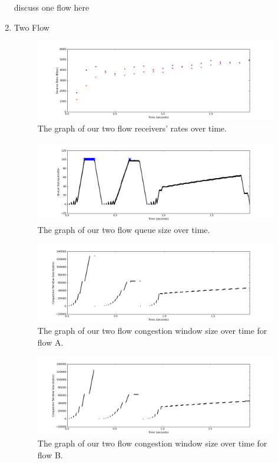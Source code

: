 \documentclass[11pt]{article}
\begin{document}
\begin{enumerate}
discuss one flow here

\bigskip
\item Two Flow

\begin{figure}[H]
\caption{The graph of our two flow receivers' rates over time.}
  \label{figure5}
    \centering
    \includegraphics[width=\linewidth]{2f_rate.png}
\end{figure}

\begin{figure}[H]
\caption{The graph of our two flow queue size over time.}
  \label{figure6}
    \centering
    \includegraphics[width=\linewidth]{2f_queue.png}
\end{figure}

\begin{figure}[H]
\caption{The graph of our two flow congestion window size over time for flow A.}
  \label{figure7}
    \centering
    \includegraphics[width=\linewidth]{2f1_window.png}
\end{figure}

\begin{figure}[H]
\caption{The graph of our two flow congestion window size over time for flow B.}
  \label{figure8}
    \centering
    \includegraphics[width=\linewidth]{2f2_window.png}
\end{figure}


\end{enumerate}
\end{document}
